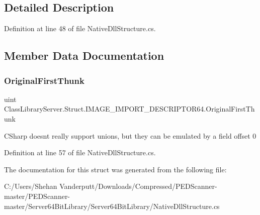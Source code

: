 \subsection{Detailed Description}


Definition at line 48 of file Native\+Dll\+Structure.\+cs.



\subsection{Member Data Documentation}
\mbox{\label{struct_class_library_server_1_1_struct_1_1_i_m_a_g_e___i_m_p_o_r_t___d_e_s_c_r_i_p_t_o_r64_a9f7c1543d5cfeffc4b03e290e7f423e6}} 
\subsubsection{\texorpdfstring{Original\+First\+Thunk}{OriginalFirstThunk}}
{\footnotesize\ttfamily uint Class\+Library\+Server.\+Struct.\+I\+M\+A\+G\+E\+\_\+\+I\+M\+P\+O\+R\+T\+\_\+\+D\+E\+S\+C\+R\+I\+P\+T\+O\+R64.\+Original\+First\+Thunk}



C\+Sharp doesnt really support unions, but they can be emulated by a field offset 0 



Definition at line 57 of file Native\+Dll\+Structure.\+cs.



The documentation for this struct was generated from the following file\+:\begin{DoxyCompactItemize}
\item 
C\+:/\+Users/\+Shehan Vanderputt/\+Downloads/\+Compressed/\+P\+E\+D\+Scanner-\/master/\+P\+E\+D\+Scanner-\/master/\+Server64\+Bit\+Library/\+Server64\+Bit\+Library/Native\+Dll\+Structure.\+cs\end{DoxyCompactItemize}
